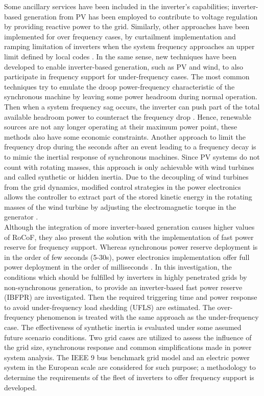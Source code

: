 Some ancillary services have been included in the inverter’s capabilities; inverter-based generation from PV has been employed to contribute to voltage regulation by providing reactive power to the grid. Similarly, other approaches have been implemented for over frequency cases, by curtailment implementation and ramping limitation of inverters when the system frequency approaches an upper limit defined by local codes \cite{hoke2018fast, hokefreqwatt}. In the same sense, new techniques have been developed to enable inverter-based generation, such as PV and wind, to also participate in frequency support for under-frequency cases. The most common techniques try to emulate the droop power-frequency characteristic of the synchronous machine by leaving some power headroom during normal operation. Then when a system frequency sag occurs, the inverter can push part of the total available headroom power to counteract the frequency drop \cite{dreidy2017inertia}. Hence, renewable sources are not any longer operating at their maximum power point, these methods also have some economic constraints. Another approach to limit the frequency drop during the seconds after an event leading to a frequency decay is to mimic the inertial response of synchronous machines. Since PV systems do not count with rotating masses, this approach is only achievable with wind turbines and called synthetic or hidden inertia. Due to the decoupling of wind turbines from the grid dynamics, modified control strategies in the power electronics allows the controller to extract part of the stored kinetic energy in the rotating masses of the wind turbine by adjusting the electromagnetic torque in the generator \cite{dreidy2017inertia}. \\

Although the integration of more inverter-based generation causes higher values of RoCoF, they also present the solution with the implementation of fast power reserve for frequency support. Whereas synchronous power reserve deployment is in the order of few seconds (5-30s), power electronics implementation offer full power deployment in the order of milliseconds \cite{miller2017technology}. In this investigation, the conditions which should be fulfilled by inverters in highly penetrated grids by non-synchronous generation, to provide an inverter-based fast power reserve (IBFPR) are investigated. Then the required triggering time and power response to avoid under-frequency load shedding (UFLS) are estimated. The over-frequency phenomenon is treated with the same approach as the under-frequency case. The effectiveness of synthetic inertia is evaluated under some assumed future scenario conditions. Two grid cases are utilized to assess the influence of the grid size, synchronous response and common simplifications made in power system analysis. The IEEE 9 bus benchmark grid model and an electric power system in the European scale are considered for such purpose; a methodology to determine the requirements of the fleet of inverters to offer frequency support is developed.
